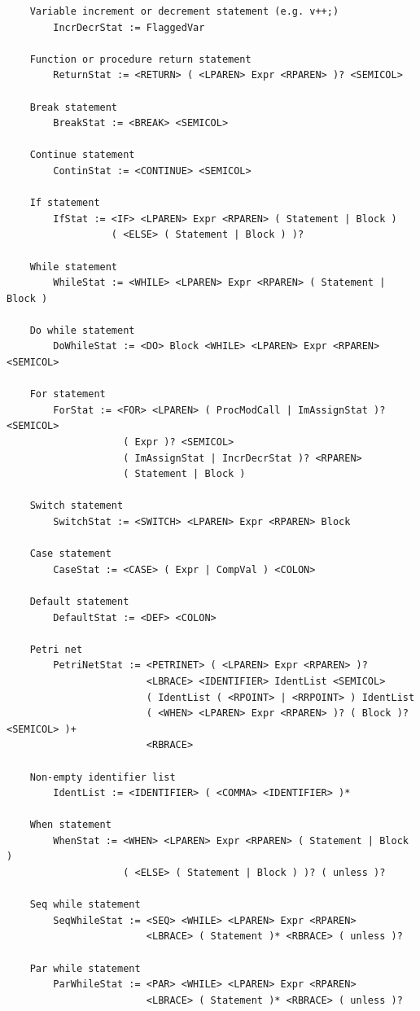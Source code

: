 \begin{verbatim}
    Variable increment or decrement statement (e.g. v++;)
        IncrDecrStat := FlaggedVar

    Function or procedure return statement
        ReturnStat := <RETURN> ( <LPAREN> Expr <RPAREN> )? <SEMICOL>

    Break statement
        BreakStat := <BREAK> <SEMICOL>

    Continue statement
        ContinStat := <CONTINUE> <SEMICOL>

    If statement
        IfStat := <IF> <LPAREN> Expr <RPAREN> ( Statement | Block )
                  ( <ELSE> ( Statement | Block ) )?

    While statement
        WhileStat := <WHILE> <LPAREN> Expr <RPAREN> ( Statement | Block )

    Do while statement
        DoWhileStat := <DO> Block <WHILE> <LPAREN> Expr <RPAREN> <SEMICOL>

    For statement
        ForStat := <FOR> <LPAREN> ( ProcModCall | ImAssignStat )? <SEMICOL>
                    ( Expr )? <SEMICOL>
                    ( ImAssignStat | IncrDecrStat )? <RPAREN>
                    ( Statement | Block )

    Switch statement
        SwitchStat := <SWITCH> <LPAREN> Expr <RPAREN> Block

    Case statement
        CaseStat := <CASE> ( Expr | CompVal ) <COLON>

    Default statement
        DefaultStat := <DEF> <COLON>

    Petri net
        PetriNetStat := <PETRINET> ( <LPAREN> Expr <RPAREN> )?
                        <LBRACE> <IDENTIFIER> IdentList <SEMICOL>
                        ( IdentList ( <RPOINT> | <RRPOINT> ) IdentList
                        ( <WHEN> <LPAREN> Expr <RPAREN> )? ( Block )? <SEMICOL> )+
                        <RBRACE>

    Non-empty identifier list
        IdentList := <IDENTIFIER> ( <COMMA> <IDENTIFIER> )*

    When statement
        WhenStat := <WHEN> <LPAREN> Expr <RPAREN> ( Statement | Block )
                    ( <ELSE> ( Statement | Block ) )? ( unless )?

    Seq while statement
        SeqWhileStat := <SEQ> <WHILE> <LPAREN> Expr <RPAREN>
                        <LBRACE> ( Statement )* <RBRACE> ( unless )?

    Par while statement
        ParWhileStat := <PAR> <WHILE> <LPAREN> Expr <RPAREN>
                        <LBRACE> ( Statement )* <RBRACE> ( unless )?


\end{verbatim}

